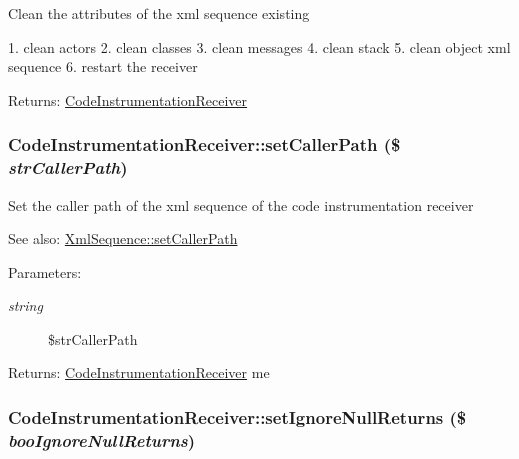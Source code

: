Clean the attributes of the xml sequence existing

1. clean actors 2. clean classes 3. clean messages 4. clean stack 5. clean object xml sequence 6. restart the receiver

\begin{Desc}
\item[Returns:]\hyperlink{class_code_instrumentation_receiver}{CodeInstrumentationReceiver} \end{Desc}
\hypertarget{class_code_instrumentation_receiver_187013c79a78480d90269bd6e66c6772}{
\subsubsection[{setCallerPath}]{\setlength{\rightskip}{0pt plus 5cm}CodeInstrumentationReceiver::setCallerPath (\$ {\em strCallerPath})}}
\label{class_code_instrumentation_receiver_187013c79a78480d90269bd6e66c6772}


Set the caller path of the xml sequence of the code instrumentation receiver

\begin{Desc}
\item[See also:]\hyperlink{class_xml_sequence_2b5e654d8a5559dc263da2d3bdbd043e}{XmlSequence::setCallerPath} \end{Desc}
\begin{Desc}
\item[Parameters:]
\begin{description}
\item[{\em string}]\$strCallerPath \end{description}
\end{Desc}
\begin{Desc}
\item[Returns:]\hyperlink{class_code_instrumentation_receiver}{CodeInstrumentationReceiver} me \end{Desc}
\hypertarget{class_code_instrumentation_receiver_6d6ba9a97475d3f300ec905ef3fc6d7a}{
\subsubsection[{setIgnoreNullReturns}]{\setlength{\rightskip}{0pt plus 5cm}CodeInstrumentationReceiver::setIgnoreNullReturns (\$ {\em booIgnoreNullReturns})}}
\label{class_code_instrumentation_receiver_6d6ba9a97475d3f300ec905ef3fc6d7a}


